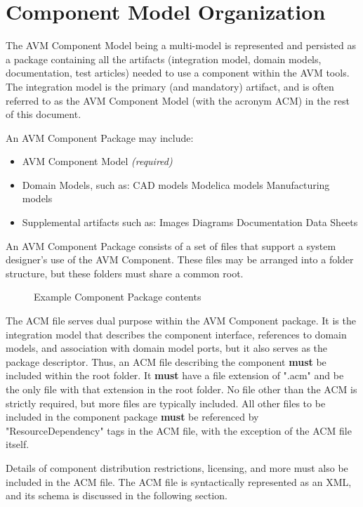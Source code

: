 \section{Component Model Organization}
The AVM Component Model being a multi-model is represented and persisted as a package containing all the artifacts (integration model, domain models, documentation, test articles) needed to use a component within the AVM tools. The integration model is the primary (and mandatory) artifact, and is often referred to as the AVM Component Model (with the acronym ACM) in the rest of this document.  

An AVM Component Package may include:
\begin{itemize}
\item AVM Component Model \emph{(required)}
\item Domain Models, such as:
\subitem CAD models
\subitem Modelica models
\subitem Manufacturing models
\item Supplemental artifacts such as:
\subitem Images
\subitem Diagrams
\subitem Documentation
\subitem Data Sheets
\end{itemize}

An AVM Component Package consists of a set of files that support a system designer's use of the AVM Component. These files may be arranged into a folder structure, but these folders must share a common root.

\begin{figure}
\caption{Example Component Package contents}
\label{Component_Package}
\end{figure}

The ACM file serves dual purpose within the AVM Component package. It is the integration model that describes the component interface, references to domain models, and association with domain model ports, but it also serves as the package descriptor. Thus, an ACM file describing the component \textbf{must} be included within the root folder. It \textbf{must} have a file extension of ".acm" and be the only file with that extension in the root folder. No file other than the ACM is strictly required, but more files are typically included. All other files to be included in the component package \textbf{must} be referenced by "ResourceDependency" tags in the ACM file, with the exception of the ACM file itself.

Details of component distribution restrictions, licensing, and more must also be included in the ACM file. The ACM file is syntactically represented as an XML, and its schema is discussed in the following section.

